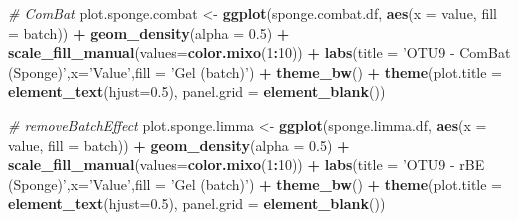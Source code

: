 \documentclass[]{book}
\newenvironment{Shaded}{\begin{snugshade}}{\end{snugshade}}
\newcommand{\KeywordTok}[1]{\textcolor[rgb]{0.13,0.29,0.53}{\textbf{#1}}}
\newcommand{\DataTypeTok}[1]{\textcolor[rgb]{0.13,0.29,0.53}{#1}}
\newcommand{\DecValTok}[1]{\textcolor[rgb]{0.00,0.00,0.81}{#1}}
\newcommand{\FloatTok}[1]{\textcolor[rgb]{0.00,0.00,0.81}{#1}}
\newcommand{\StringTok}[1]{\textcolor[rgb]{0.31,0.60,0.02}{#1}}
\newcommand{\CommentTok}[1]{\textcolor[rgb]{0.56,0.35,0.01}{\textit{#1}}}
\newcommand{\OperatorTok}[1]{\textcolor[rgb]{0.81,0.36,0.00}{\textbf{#1}}}
\newcommand{\NormalTok}[1]{#1}
\begin{document}
\begin{Shaded}
\begin{Highlighting}[]
\CommentTok{# ComBat}
\NormalTok{plot.sponge.combat <-}\StringTok{ }\KeywordTok{ggplot}\NormalTok{(sponge.combat.df, }\KeywordTok{aes}\NormalTok{(}\DataTypeTok{x =}\NormalTok{ value, }\DataTypeTok{fill =}\NormalTok{ batch)) }\OperatorTok{+}\StringTok{ }\KeywordTok{geom_density}\NormalTok{(}\DataTypeTok{alpha =} \FloatTok{0.5}\NormalTok{) }\OperatorTok{+}\StringTok{ }\KeywordTok{scale_fill_manual}\NormalTok{(}\DataTypeTok{values=}\KeywordTok{color.mixo}\NormalTok{(}\DecValTok{1}\OperatorTok{:}\DecValTok{10}\NormalTok{)) }\OperatorTok{+}\StringTok{ }\KeywordTok{labs}\NormalTok{(}\DataTypeTok{title =} \StringTok{'OTU9 - ComBat (Sponge)'}\NormalTok{,}\DataTypeTok{x=}\StringTok{'Value'}\NormalTok{,}\DataTypeTok{fill =} \StringTok{'Gel (batch)'}\NormalTok{) }\OperatorTok{+}\StringTok{ }\KeywordTok{theme_bw}\NormalTok{() }\OperatorTok{+}\StringTok{ }\KeywordTok{theme}\NormalTok{(}\DataTypeTok{plot.title =} \KeywordTok{element_text}\NormalTok{(}\DataTypeTok{hjust=}\FloatTok{0.5}\NormalTok{), }\DataTypeTok{panel.grid =} \KeywordTok{element_blank}\NormalTok{())}


\CommentTok{# removeBatchEffect }
\NormalTok{plot.sponge.limma <-}\StringTok{ }\KeywordTok{ggplot}\NormalTok{(sponge.limma.df, }\KeywordTok{aes}\NormalTok{(}\DataTypeTok{x =}\NormalTok{ value, }\DataTypeTok{fill =}\NormalTok{ batch)) }\OperatorTok{+}\StringTok{ }\KeywordTok{geom_density}\NormalTok{(}\DataTypeTok{alpha =} \FloatTok{0.5}\NormalTok{) }\OperatorTok{+}\StringTok{ }\KeywordTok{scale_fill_manual}\NormalTok{(}\DataTypeTok{values=}\KeywordTok{color.mixo}\NormalTok{(}\DecValTok{1}\OperatorTok{:}\DecValTok{10}\NormalTok{)) }\OperatorTok{+}\StringTok{ }\KeywordTok{labs}\NormalTok{(}\DataTypeTok{title =} \StringTok{'OTU9 - rBE (Sponge)'}\NormalTok{,}\DataTypeTok{x=}\StringTok{'Value'}\NormalTok{,}\DataTypeTok{fill =} \StringTok{'Gel (batch)'}\NormalTok{) }\OperatorTok{+}\StringTok{ }\KeywordTok{theme_bw}\NormalTok{() }\OperatorTok{+}\StringTok{ }\KeywordTok{theme}\NormalTok{(}\DataTypeTok{plot.title =} \KeywordTok{element_text}\NormalTok{(}\DataTypeTok{hjust=}\FloatTok{0.5}\NormalTok{), }\DataTypeTok{panel.grid =} \KeywordTok{element_blank}\NormalTok{())}



\end{Highlighting}
\end{Shaded}
\end{document}
